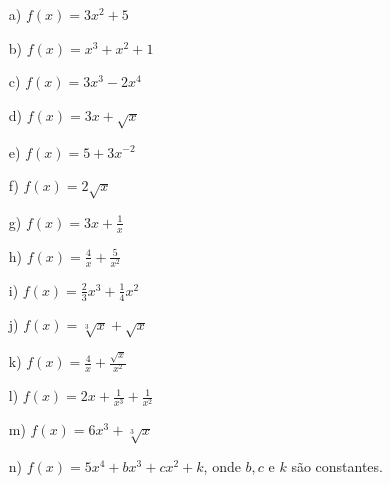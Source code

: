 \documentclass[12pt,openright,twoside,a4paper]{article}
\theoremstyle{definition}
\begin{document}
	\begin{itemize}
		\item[a)] \(f(x) = 3x^2 + 5\)
		\item[b)] \(f(x) = x^3 + x^2 + 1\)
		\item[c)] \(f(x) = 3x^3 - 2x^4\)
		\item[d)] \(f(x) = 3x + \sqrt{x}\)
		\item[e)] \(f(x) = 5 + 3x^{-2}\)
		\item[f)] \(f(x) = 2\sqrt{x}\)
		\item[g)] \(f(x) = 3x + \tfrac{1}{x}\)
		\item[h)] \(f(x) = \tfrac{4}{x} + \tfrac{5}{x^2}\)
		\item[i)] \(f(x) = \tfrac{2}{3}x^3 + \tfrac{1}{4}x^2\)
		\item[j)] \(f(x) = \sqrt[3]{x} + \sqrt{x}\)
		\item[k)] \(f(x) = \tfrac{4}{x} + \tfrac{\sqrt{x}}{x^2}\)
		\item[l)] \(f(x) = 2x + \tfrac{1}{x^3} + \tfrac{1}{x^2}\)
		\item[m)] \(f(x) = 6x^3 + \sqrt[3]{x}\)
		\item[n)] \(f(x) = 5x^4 + bx^3 + cx^2 + k\), onde \(b, c\) e \(k\) são constantes.
	\end{itemize}
	
\end{document}
